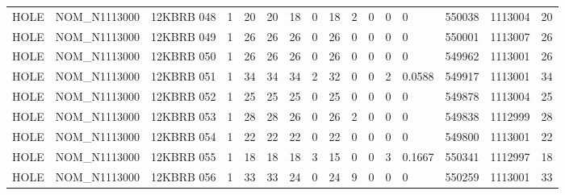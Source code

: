 \begin{table}[ht]
\begin{tabular}{llllllllllllllll}
HOLE & NOM\_N1113000 & 12KBRB 048 & 1 & 20 & 20 & 18 & 0 & 18 & 2 & 0 & 0 & 0 & 550038 & 1113004 & 20 \\
HOLE & NOM\_N1113000 & 12KBRB 049 & 1 & 26 & 26 & 26 & 0 & 26 & 0 & 0 & 0 & 0 & 550001 & 1113007 & 26 \\
HOLE & NOM\_N1113000 & 12KBRB 050 & 1 & 26 & 26 & 26 & 0 & 26 & 0 & 0 & 0 & 0 & 549962 & 1113001 & 26 \\
HOLE & NOM\_N1113000 & 12KBRB 051 & 1 & 34 & 34 & 34 & 2 & 32 & 0 & 0 & 2 & 0.0588 & 549917 & 1113001 & 34 \\
HOLE & NOM\_N1113000 & 12KBRB 052 & 1 & 25 & 25 & 25 & 0 & 25 & 0 & 0 & 0 & 0 & 549878 & 1113004 & 25 \\
HOLE & NOM\_N1113000 & 12KBRB 053 & 1 & 28 & 28 & 26 & 0 & 26 & 2 & 0 & 0 & 0 & 549838 & 1112999 & 28 \\
HOLE & NOM\_N1113000 & 12KBRB 054 & 1 & 22 & 22 & 22 & 0 & 22 & 0 & 0 & 0 & 0 & 549800 & 1113001 & 22 \\
HOLE & NOM\_N1113000 & 12KBRB 055 & 1 & 18 & 18 & 18 & 3 & 15 & 0 & 0 & 3 & 0.1667 & 550341 & 1112997 & 18 \\
HOLE & NOM\_N1113000 & 12KBRB 056 & 1 & 33 & 33 & 24 & 0 & 24 & 9 & 0 & 0 & 0 & 550259 & 1113001 & 33 \\
\bottomrule
\end{tabular}
\end{table}
